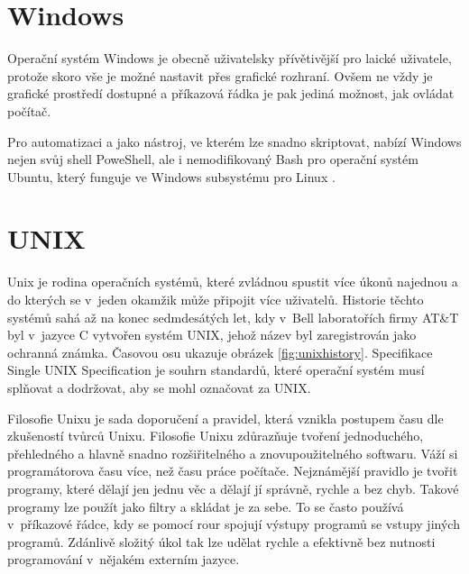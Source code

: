 \documentclass[thesis=M,czech]{FITthesis}[2012/06/26]
\begin{document}
%
\section{Windows}

Operační systém Windows \cite{windows} je obecně uživatelsky přívětivější pro laické uživatele, protože skoro vše je možné nastavit přes grafické rozhraní. Ovšem ne vždy je grafické prostředí dostupné a příkazová řádka je pak jediná možnost, jak ovládat počítač.

Pro automatizaci a jako nástroj, ve kterém lze snadno skriptovat, nabízí Windows nejen svůj shell PoweShell, ale i nemodifikovaný Bash pro operační systém Ubuntu, který funguje ve Windows subsystému pro Linux \cite{windowscmd}.


\section{UNIX}

Unix je rodina operačních systémů, které zvládnou spustit více úkonů najednou a do kterých se v~jeden okamžik může připojit více uživatelů. Historie těchto systémů sahá až na konec sedmdesátých let, kdy v~Bell laboratořích firmy AT\&T byl v~jazyce C vytvořen systém UNIX, jehož název byl zaregistrován jako ochranná známka. Časovou osu ukazuje obrázek \ref{fig:unixhistory}. Specifikace Single UNIX Specification \cite{sus} je souhrn standardů, které operační systém musí splňovat a dodržovat, aby se mohl označovat za UNIX.

Filosofie Unixu je sada doporučení a pravidel, která vznikla postupem času dle zkušeností tvůrců Unixu. Filosofie Unixu zdůrazňuje tvoření jednoduchého, přehledného a hlavně snadno rozšiřitelného a znovupoužitelného softwaru. Váží si programátorova času více, než času práce počítače. Nejznámější pravidlo je tvořit programy, které dělají jen jednu věc a dělají jí správně, rychle a bez chyb. Takové programy lze použít jako filtry a skládat je za sebe. To se často používá v~příkazové řádce, kdy se pomocí rour spojují výstupy programů se vstupy jiných programů. Zdánlivě složitý úkol tak lze udělat rychle a efektivně bez nutnosti programování v~nějakém externím jazyce.
\end{document}
